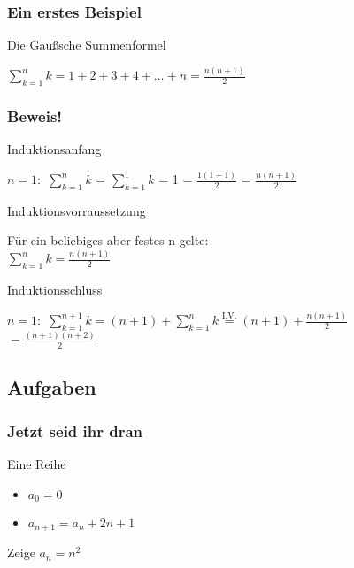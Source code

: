 \documentclass{beamer}
\begin{document}
\begin{frame}
	\frametitle{Ein erstes Beispiel}
	\begin{block}{Die Gaußsche Summenformel}
		\begin{center}
			$\sum\limits_{k=1}^{n}k = 1 + 2 + 3 + 4 + \ldots + n =
			\frac{n(n+1)}{2}$
		\end{center}
	\end{block}
\end{frame}

\begin{frame}
	\frametitle{Beweis!}
	\begin{block}{Induktionsanfang}
		\begin{center}
			$n = 1:$ \hspace{10mm} $\sum\limits_{k=1}^{n}k$ = $\sum\limits_{k=1}				^{1}k$ = 1
			= $\frac{1(1+1)}{2}$ = $\frac{n(n+1)}{2}$ \hspace{15mm} \uncover<2->{$				\Box$}
		\end{center}
	\end{block}
	{
		\begin{block}{Induktionsvorraussetzung}
			\begin{center}
				F\"ur ein beliebiges aber festes n gelte: \\
				$\sum\limits_{k=1}^{n}k = \frac{n(n+1)}{2}$
			\end{center}
		\end{block} 
	}
	{
		\begin{block}{Induktionsschluss}
			\begin{center}	
				$n = 1:$ \hspace{10mm}
				$\sum\limits_{k=1}^{n+1}k = (n+1)+ \sum\limits_{k=1}^{n}k 								\stackrel{\mathrm{I.V.}}=
				(n+1)+\frac{n(n+1)}{2} $ \\
				$= \frac{(n+1)(n+2)}{2} $ \uncover<5->{$\Box$}
			\end{center}
		\end{block} 
	}
\end{frame}

\subsection[Aufgaben]{Aufgaben}
\begin{frame}
	\frametitle{Jetzt seid ihr dran}
	\begin{block}{Eine Reihe}
		\begin{itemize}
			\item $a_{0} = 0$
			\item $a_{n+1} = a_{n} + 2n + 1$
		\end{itemize}
	\end{block}
	\vspace{5mm}
	{
		\begin{block}{Zeige}
			$a_n = n^2$
		\end{block}
	}
\end{frame}
\end{document}
